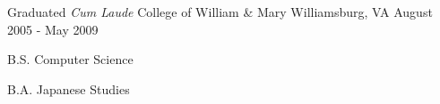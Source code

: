 

\begin{cventries}

  \cventry
    {Graduated \emph{Cum Laude}} %
    {College of William \& Mary} %
    {Williamsburg, VA} %
    {August 2005 - May 2009} %
    {
      \begin{cvitems} %
        \item {B.S. Computer Science}
        \item {B.A. Japanese Studies}
      \end{cvitems}
    }

\end{cventries}

